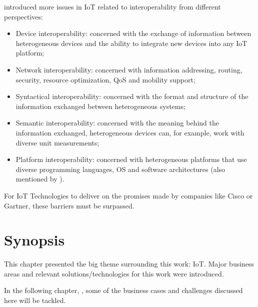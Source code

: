 \cite{noura2019interoperability} introduced more issues in \gls{IoT} related to interoperability from different perspectives:

\begin{itemize}
    \item Device interoperability: concerned with the exchange of information between heterogeneous devices and the ability to integrate new devices into any \gls{IoT} platform;
    \item Network interoperability: concerned with information addressing, routing, security, resource optimization, \gls{QoS} and mobility support;
    \item Syntactical interoperability: concerned with the format and structure of the information exchanged between heterogeneous systems;
    \item Semantic interoperability: concerned with the meaning behind the information exchanged, heterogeneous devices can, for example, work with diverse unit measurements;
    \item Platform interoperability: concerned with heterogeneous platforms that use diverse programming languages, \gls{OS} and software architectures (also mentioned by \cite{KOO20224191, SILVA2018697, DIAS2022100529, RAY201635}).
\end{itemize}

For \gls{IoT} Technologies to deliver on the promises made by companies like Cisco or Gartner, these barriers must be surpassed.

\section{Synopsis}
\label{sec:stateofart:synopsis}

This chapter presented the big theme surrounding this work: \gls{IoT}.
Major business areas and relevant solutions/technologies for this work were introduced.

In the following chapter, , some of the business cases and challenges discussed here will be tackled.
